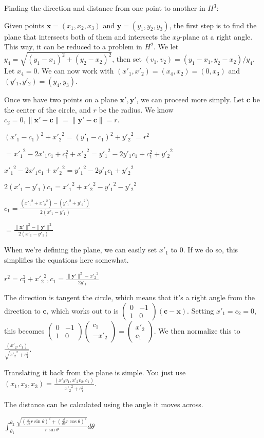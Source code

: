 \documentclass[12pt]{amsart}
\newcommand{\mat}[4]{\left(\begin{array}{ccc} #1 & #2 \\#3 & #4 \end{array} \right)}
\newcommand{\vect}[2]{\left(\begin{array}{ccc} #1 \\#2 \end{array} \right)}
\begin{document}
Finding the direction and distance from one point to another in $H^3$:

Given points $\textbf{x} = (x_1,x_2,x_3)$ and $\textbf{y} = (y_1,y_2,y_3)$, the first step is to find the plane that intersects both of them and intersects the $xy$-plane at a right angle. This way, it can be reduced to a problem in $H^2$. We let $y_4 = \sqrt{(y_1-x_1)^2 + (y_2-x_2)^2}$, then set $(v_1,v_2) = (y_1-x_1,y_2-x_2)/y_4$. Let $x_4 = 0$. We can now work with $(x'_1,x'_2) = (x_4,x_2) = (0,x_3)$ and $(y'_1,y'_2) = (y_4,y_3)$.


Once we have two points on a plane $\textbf{x}', \textbf{y}'$, we can proceed more simply. Let $\textbf{c}$ be the center of the circle, and $r$ be the radius. We know $c_2 = 0, \|\textbf{x}'-\textbf{c}\| = \|\textbf{y}'-\textbf{c}\| = r$.

$(x'_1-c_1)^2+{x'_2}^2 = (y'_1-c_1)^2+{y'_2}^2 = r^2$

$= {x'_1}^2-2x'_1c_1+c_1^2+{x'_2}^2 = {y'_1}^2-2y'_1c_1+c_1^2+{y'_2}^2$

${x'_1}^2-2x'_1c_1+{x'_2}^2 = {y'_1}^2-2y'_1c_1+{y'_2}^2$

$2(x'_1-y'_1)c_1 = {x'_1}^2+{x'_2}^2-{y'_1}^2-{y'_2}^2$

$c_1 = \frac{({x'_1}^2+{x'_2}^2)-({y'_1}^2+{y'_2}^2)}{2(x'_1-y'_1)}$

$= \frac{\|\textbf{x}'\|^2-\|\textbf{y}'\|^2}{2(x'_1-y'_1)}$

When we're defining the plane, we can easily set $x'_1$ to $0$. If we do so, this simplifies the equations here somewhat.

$r^2 = c_1^2+{x'_2}^2, c_1 = \frac{\|\textbf{y}'\|^2-{x'_2}^2}{2y'_1}$

The direction is tangent the circle, which means that it's a right angle from the direction to $\textbf{c}$, which works out to is $\mat{0}{-1}{1}{0}(\textbf{c}-\textbf{x})$. Setting $x'_1 = c_2 = 0$, this becomes $\mat{0}{-1}{1}{0}\vect{c_1}{-x'_2} = \vect{x'_2}{c_1}$. We then normalize this to $\frac{(x'_2,c_1)}{\sqrt{{x'_2}^2+c_1^2}}$.

Translating it back from the plane is simple. You just use $(x_1,x_2,x_3) = \frac{(x'_2v_1,x'_2v_2,c_1)}{{x'_2}^2+c_1^2}$.

The distance can be calculated using the angle it moves across.

$\int_{\theta_1}^{\theta_2} \frac{\sqrt{(\frac{d}{d\theta}r\sin\theta)^2+(\frac{d}{d\theta}r\cos\theta)^2}}{r\sin\theta} d\theta$
\end{document}

